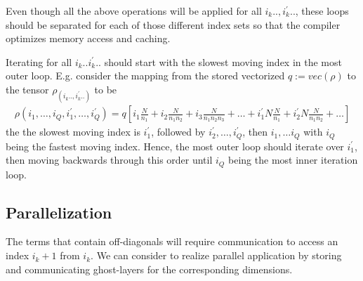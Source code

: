 \documentclass[letterpaper]{article}
\begin{document}
  Even though all the above operations will be applied for all $i_k.., i_k^\prime..$, these loops should be separated for each of those different index sets so that the compiler optimizes memory access and caching.

  Iterating for all $i_k..i_k^\prime..$ should start with the slowest moving index in the most outer loop. E.g. consider the mapping from the stored vectorized $q := vec(\rho)$ to the tensor $\rho_(i_k..,i_k^\prime..)$ to be
    \begin{align}
        \rho(i_1,\dots,i_Q,i_1^\prime,\dots,i_Q^\prime) = q[i_1 \frac{N}{n_1} + i_2\frac{N}{n_1n_2} + i_3\frac{N}{n_1n_2n_3} + \dots + i_1^\prime N\frac{N}{n_1} + i_2^\prime N\frac{N}{n_1n_2} + \dots]
    \end{align}
  the the slowest moving index is $i_1^\prime$, followed by $i_2^\prime, \dots, i_Q^\prime$, then $i_1, \dots i_Q$ with $i_Q$ being the fastest moving index. Hence, the most outer loop should iterate over $i_1^\prime$, then moving backwards through this order until $i_Q$ being the most inner iteration loop.

 \subsection{Parallelization} 
 The terms that contain off-diagonals will require communication to access an index $i_k+1$ from $i_k$. We can consider to realize parallel application by storing and communicating ghost-layers for the corresponding dimensions. 
\end{document}
